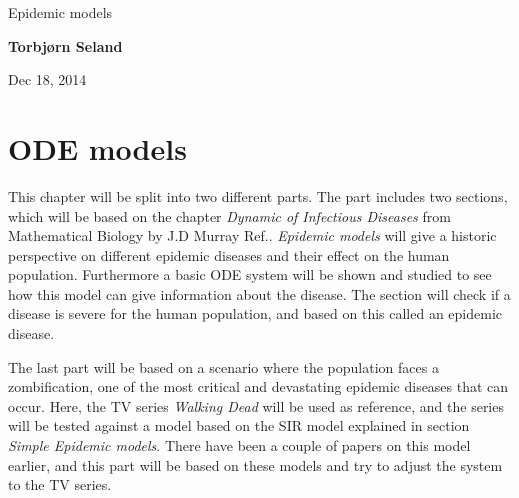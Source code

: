 \documentclass[%
twoside,                 %
final,                   %
chapterprefix=true,      %
open=right               %
10pt]{book}
\begin{document}




\thispagestyle{empty}

\begin{center}
{\LARGE\bf
\begin{spacing}{1.25}
Epidemic models
\end{spacing}
}
\end{center}


\begin{center}
{\bf Torbjørn Seland${}^{}$} \\ [0mm]
\end{center}

    \begin{center}
\end{center}


\begin{center}
Dec 18, 2014
\end{center}

\vspace{1cm}


\newcommand{\Imax}{I_{\textrm{max}}}
\chapter{ODE models}
\label{section:ODE_models}
This chapter will be split into two different parts. The part includes two sections, which will be based on the chapter \emph{Dynamic of Infectious Diseases} from Mathematical Biology by J.D Murray Ref.\cite{murray2002mathematical}. \emph{Epidemic models} will give a historic perspective on different epidemic diseases and their effect on the human population. Furthermore a basic ODE system will be shown and studied to see how this model can give information about the disease. The section will check if a disease is severe for the human population, and based on this called an epidemic disease.


\vspace{3mm}




\vspace{3mm}


The last part will be based on a scenario where the population faces a zombification, one of the most critical and devastating epidemic diseases that can occur. Here, the TV series \emph{Walking Dead} will be used as reference, and the series will be tested against a model based on the SIR model explained in section \emph{Simple Epidemic models}. There have been a couple of papers on this model earlier, and this part will be based on these models and try to adjust the system to the TV series.     
\end{document}
